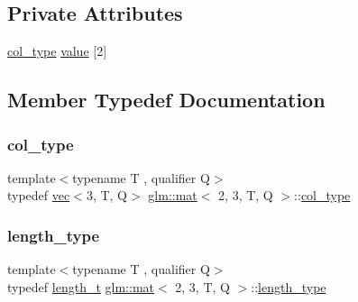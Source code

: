 \subsection*{Private Attributes}
\begin{DoxyCompactItemize}
\item 
\hyperlink{structglm_1_1mat_3_012_00_013_00_01_t_00_01_q_01_4_aebe4faf14ea1bc3092b4bbf591d7194e}{col\+\_\+type} \hyperlink{structglm_1_1mat_3_012_00_013_00_01_t_00_01_q_01_4_a6ffb5e68032090a7980ff22e64eff8cf}{value} \mbox{[}2\mbox{]}
\end{DoxyCompactItemize}


\subsection{Member Typedef Documentation}
\mbox{\label{structglm_1_1mat_3_012_00_013_00_01_t_00_01_q_01_4_aebe4faf14ea1bc3092b4bbf591d7194e}} 
\subsubsection{\texorpdfstring{col\+\_\+type}{col\_type}}
{\footnotesize\ttfamily template$<$typename T , qualifier Q$>$ \\
typedef \hyperlink{structglm_1_1vec}{vec}$<$3, T, Q$>$ \hyperlink{structglm_1_1mat}{glm\+::mat}$<$ 2, 3, T, Q $>$\+::\hyperlink{structglm_1_1mat_3_012_00_013_00_01_t_00_01_q_01_4_aebe4faf14ea1bc3092b4bbf591d7194e}{col\+\_\+type}}

\mbox{\label{structglm_1_1mat_3_012_00_013_00_01_t_00_01_q_01_4_ad2e2433ba375abcd6bada873f8ea2de1}} 
\subsubsection{\texorpdfstring{length\+\_\+type}{length\_type}}
{\footnotesize\ttfamily template$<$typename T , qualifier Q$>$ \\
typedef \hyperlink{namespaceglm_a090a0de2260835bee80e71a702492ed9}{length\+\_\+t} \hyperlink{structglm_1_1mat}{glm\+::mat}$<$ 2, 3, T, Q $>$\+::\hyperlink{structglm_1_1mat_3_012_00_013_00_01_t_00_01_q_01_4_ad2e2433ba375abcd6bada873f8ea2de1}{length\+\_\+type}}

